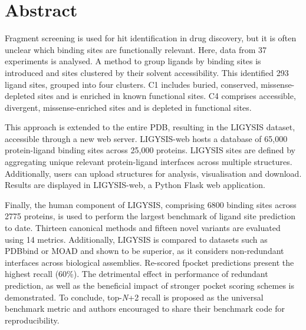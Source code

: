 \chapter*{Abstract} %

Fragment screening is used for hit identification in drug discovery, but it is often unclear which binding sites are functionally relevant. Here, data from 37 experiments is analysed. A method to group ligands by binding sites is introduced and sites clustered by their solvent accessibility. This identified 293 ligand sites, grouped into four clusters. C1 includes buried, conserved, missense-depleted sites and is enriched in known functional sites. C4 comprises accessible, divergent, missense-enriched sites and is depleted in functional sites.

This approach is extended to the entire PDB, resulting in the LIGYSIS dataset, accessible through a new web server. LIGYSIS-web hosts a database of 65,000 protein-ligand binding sites across 25,000 proteins. LIGYSIS sites are defined by aggregating unique relevant protein-ligand interfaces across multiple structures. Additionally, users can upload structures for analysis, visualisation and download. Results are displayed in LIGYSIS-web, a Python Flask web application.

Finally, the human component of LIGYSIS, comprising 6800 binding sites across 2775 proteins, is used to perform the largest benchmark of ligand site prediction to date. Thirteen canonical methods and fifteen novel variants are evaluated using 14 metrics. Additionally, LIGYSIS is compared to datasets such as PDBbind or MOAD and shown to be superior, as it considers non-redundant interfaces across biological assemblies. Re-scored fpocket predictions present the highest recall (60\%). The detrimental effect in performance of redundant prediction, as well as the beneficial impact of stronger pocket scoring schemes is demonstrated. To conclude, top-\textit{N}+2 recall is proposed as the universal benchmark metric and authors encouraged to share their benchmark code for reproducibility.
